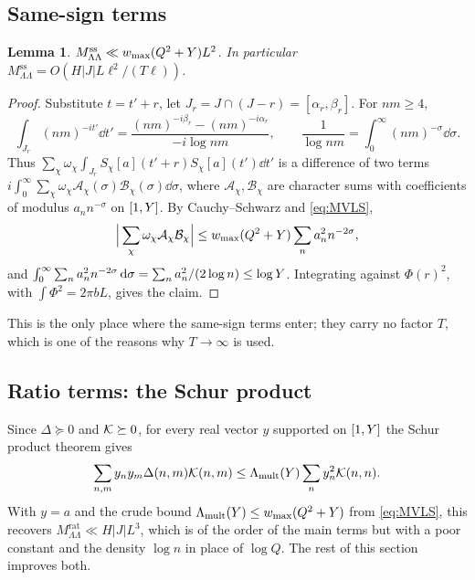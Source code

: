\documentclass[11pt]{amsart}
\newtheorem{lemma}[theorem]{Lemma}
\theoremstyle{definition}
\theoremstyle{remark}
\numberwithin{equation}{section}
\begin{document}
\subsection{Same-sign terms}
\begin{lemma}\label{lem:ss}
$M_{\Lambda\Lambda}^{\mathrm{ss}}\ll w_{\max}(Q^2+Y)L^2$. In particular $M_{\Lambda\Lambda}^{\mathrm{ss}}=O(H|J|L\ell^2/(T\ell))$.
\end{lemma}
\begin{proof}
Substitute $t=t'+r$, let $J_r=J\cap(J-r)=[\alpha_r,\beta_r]$. For $nm\ge4$,
\[
\int_{J_r}(nm)^{-it'}\dd t'=\frac{(nm)^{-i\beta_r}-(nm)^{-i\alpha_r}}{-i\log nm},\qquad\frac1{\log nm}=\int_0^\infty(nm)^{-\sigma}\dd\sigma .
\]
Thus $\sum_\chi\omega_\chi\int_{J_r}S_\chi[a](t'+r)S_\chi[a](t')\dd t'$ is a difference of two terms $i\int_0^\infty\sum_\chi\omega_\chi\mathcal A_\chi(\sigma)\mathcal B_\chi(\sigma)\dd\sigma$, where $\mathcal A_\chi,\mathcal B_\chi$ are character sums with coefficients of modulus $a_nn^{-\sigma}$ on $[1,Y]$. By Cauchy--Schwarz and \eqref{eq:MVLS},
\[
\Big|\sum_\chi\omega_\chi\mathcal A_\chi\mathcal B_\chi\Big|\le w_{\max}(Q^2+Y)\sum_na_n^2n^{-2\sigma},
\]
and $\int_0^\infty\sum_na_n^2n^{-2\sigma}\,\mathrm d\sigma=\sum_na_n^2/(2\log n)\le\log Y$. Integrating against $\Phi(r)^2$, with $\int\Phi^2=2\pi bL$, gives the claim.
\end{proof}
This is the only place where the same-sign terms enter; they carry no factor $T$, which is one of the reasons why $T\to\infty$ is used.

\subsection{Ratio terms: the Schur product}\label{sec:schur}
Since $\Delta\succeq0$ and $\mathcal K\succeq0$, for every real vector $y$ supported on $[1,Y]$ the Schur product theorem gives
\begin{equation}\label{eq:schur}
\sum_{n,m}y_ny_m\Delta(n,m)\mathcal K(n,m)\le\Lambda_{\mathrm{mult}}(Y)\sum_ny_n^2\mathcal K(n,n).
\end{equation}
With $y=a$ and the crude bound $\Lambda_{\mathrm{mult}}(Y)\le w_{\max}(Q^2+Y)$ from \eqref{eq:MVLS}, this recovers $M^{\mathrm{rat}}_{\Lambda\Lambda}\ll H|J|L^3$, which is of the order of the main terms but with a poor constant and the density $\log n$ in place of $\log Q$. The rest of this section improves both.
\end{document}
